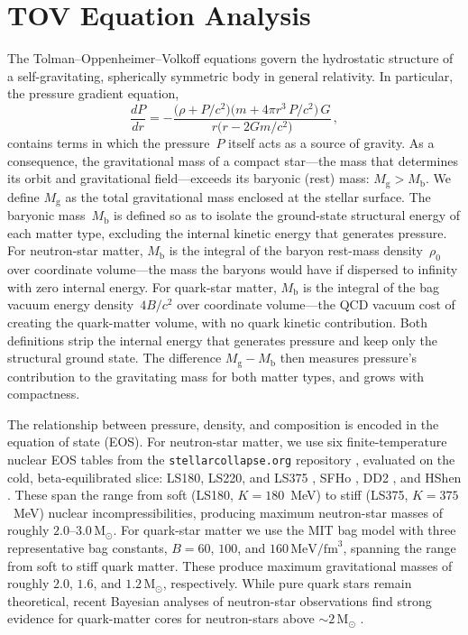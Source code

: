 \documentclass[manuscript,linenumbers]{aastex701}
\newcommand{\Msun}{\mathrm{M}_\odot}
\newcommand{\Mg}{M_{\mathrm{g}}}
\newcommand{\Mb}{M_{\mathrm{b}}}
\begin{document}
\section{TOV Equation Analysis}\label{s:tov}

The Tolman--Oppenheimer--Volkoff equations
\citep{Tolman1939,OppenheimerVolkoff1939} govern the hydrostatic
structure of a self-gravitating, spherically symmetric body in general
relativity.  In particular, the pressure gradient equation,
%
\begin{equation}\label{eq:tov}
  \frac{dP}{dr}
  = -\frac{\bigl(\rho + P/c^{2}\bigr)
           \bigl(m + 4\pi r^{3}\,P/c^{2}\bigr)\,G}
          {r\bigl(r - 2Gm/c^{2}\bigr)}\,,
\end{equation}
%
contains terms in which the pressure~$P$ itself acts as a
source of gravity.  As a consequence, the gravitational mass of a
compact star---the mass that determines its orbit and gravitational
field---exceeds its baryonic (rest) mass:
$\Mg > \Mb$.
We define $\Mg$ as the total gravitational mass enclosed at the
stellar surface.  The baryonic mass~$\Mb$ is defined so as to
isolate the ground-state structural energy of each matter type,
excluding the internal kinetic energy that generates pressure.
For neutron-star matter, $\Mb$ is the integral of the baryon
rest-mass density~$\rho_{0}$ over coordinate volume---the mass the
baryons would have if dispersed to infinity with zero internal energy.
For quark-star matter, $\Mb$ is the integral of the bag vacuum
energy density~$4B/c^{2}$ over coordinate volume---the QCD vacuum cost
of creating the quark-matter volume, with no quark kinetic
contribution.  Both definitions strip the internal energy that
generates pressure and keep only the structural ground state.  The
difference $\Mg - \Mb$ then measures pressure's contribution to
the gravitating mass for both matter types, and grows with
compactness.

The relationship between pressure, density, and composition is encoded
in the equation of state (EOS).  For neutron-star matter, we use six
finite-temperature nuclear EOS tables from the
\texttt{stellarcollapse.org} repository \citep{OConnorOtt2010},
evaluated on the cold, beta-equilibrated slice: LS180, LS220, and
LS375 \citep{LattimerSwesty1991}, SFHo
\citep{SteinerFischerHempel2013}, DD2 \citep{TypelRopkeKlaehn2010},
and HShen \citep{Shen1998}.  These span the range from soft (LS180, $K
= 180$~MeV) to stiff (LS375, $K = 375$~MeV) nuclear
incompressibilities, producing maximum neutron-star masses of roughly
$2.0$--$3.0\,\Msun$.  For quark-star matter we use the MIT bag model
\citep{Chodos1974} with three representative bag constants, $B = 60$,
$100$, and $160\,\text{MeV}/\text{fm}^{3}$, spanning the range from
soft to stiff quark matter.  These produce maximum gravitational
masses of roughly $2.0$, $1.6$, and $1.2\,\Msun$, respectively.  While
pure quark stars remain theoretical, recent Bayesian analyses of
neutron-star observations find strong evidence for quark-matter cores
for neutron-stars above ${\sim}2\,\Msun$ \citep{Annala2020}.
\end{document}
